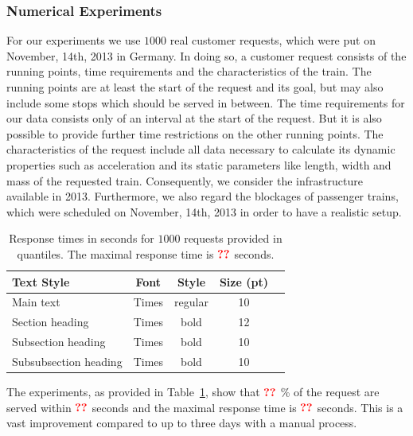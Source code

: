 \subsubsection{Numerical Experiments}
For our experiments we use $1000$ real customer requests, which were put on November, 14th, 2013 in Germany. In doing so, a customer request consists of the running points, time requirements and the characteristics of the train. The running points are at least the start of the request and its goal, but may also include some stops which should be served in between. The time requirements for our data consists only of an interval at the start of the request. But it is also possible to provide further time restrictions on the other running points. The characteristics of the request include all data necessary to calculate its dynamic properties such as acceleration and its static parameters like length, width and mass of the requested train. Consequently, we consider the infrastructure available in 2013. Furthermore, we also regard the blockages of passenger trains, which were scheduled on November, 14th, 2013 in order to have a realistic setup.
%
\begin{table}[h]
	\centering
	\caption{Response times in seconds for $1000$ requests provided in quantiles. The maximal response time is $\textbf{\textcolor{red}{??}}$ seconds.}
	\label{tab:result_CnR}
	\begin{tabular}{lcccc} \hline
		\textbf{Text Style}   & \textbf{Font} & \textbf{Style} & \textbf{Size (pt)} \\ \hline
		Main text             & Times         & regular        & 10                 \\
		Section heading       & Times         & bold           & 12                 \\
		Subsection heading    & Times         & bold           & 10                 \\
		Subsubsection heading & Times         & bold           & 10                 \\ \hline
	\end{tabular}
\end{table}
\par

The experiments, as provided in Table~\ref{tab:result_CnR}, show that $\textbf{\textcolor{red}{??}}$ \% of the request are served within $\textbf{\textcolor{red}{??}}$ seconds and the maximal response time is $\textbf{\textcolor{red}{??}}$ seconds. This is a vast improvement compared to up to three days with a manual process.

